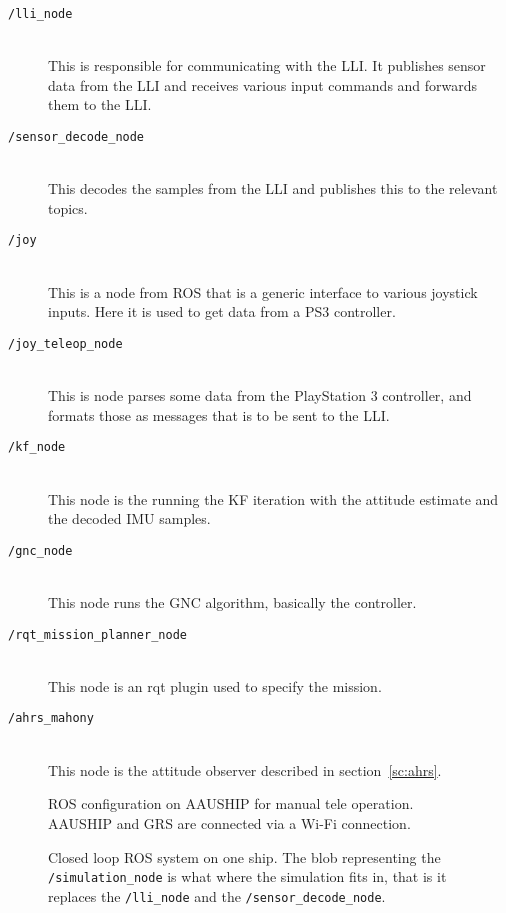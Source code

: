 \begin{description}
	\item[\texttt{/lli\_node}]\hfill \\
		This is responsible for communicating with the \ac{LLI}. It
		publishes sensor data from the \ac{LLI} and receives various input
		commands and forwards them to the \ac{LLI}.
	\item[\texttt{/sensor\_decode\_node}]\hfill \\
		This decodes the samples from the \ac{LLI} and publishes this to
		the relevant topics. 
	\item[\texttt{/joy}]\hfill \\
		This is a node from \ac{ROS} that is a generic interface to
		various joystick inputs. Here it is used to get data from a PS3
		controller.
	\item[\texttt{/joy\_teleop\_node}]\hfill \\
		This is node parses some data from the PlayStation 3 controller, and formats
		those as messages that is to be sent to the \ac{LLI}.
	\item[\texttt{/kf\_node}]\hfill \\
		This node is the running the \ac{KF} iteration with the attitude estimate and
		the decoded \ac{IMU} samples.
	\item[\texttt{/gnc\_node}]\hfill \\
		This node runs the \ac{GNC} algorithm, basically the controller.
	\item[\texttt{/rqt\_mission\_planner\_node}]\hfill \\
		This node is an rqt plugin used to specify the mission.
	\item[\texttt{/ahrs\_mahony}]\hfill \\
		This node is the attitude observer described in
		section~\vref{sc:ahrs}.
\end{description}

\begin{figure}[htbp]
	\centering
	
	\caption{ROS configuration on AAUSHIP for manual tele operation.
	AAUSHIP and GRS are connected via a Wi-Fi connection.}
	\label{fig:ros-aauship-teleop}
\end{figure}

\begin{figure}[htbp]
	\centering
	{\footnotesize
	}
	\caption{Closed loop ROS system on one ship. The blob representing
		the \texttt{/simulation\_node} is what where the simulation fits
		in, that is it replaces the \texttt{/lli\_node} and the
		\texttt{/sensor\_decode\_node}.}
	\label{fig:ros-aauship-closed-loop-single}
\end{figure}


